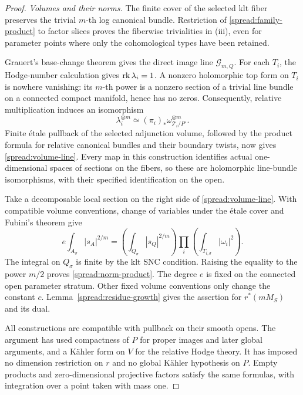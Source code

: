 \begin{proof}
\smallskip
\noindent\emph{Volumes and their norms.}
The finite cover of the selected klt fiber preserves the trivial
\(m\)-th log canonical bundle.  Restriction of
\eqref{spread:family-product} to factor slices proves the fiberwise
trivialities in (iii), even for parameter points where only the
cohomological types have been retained.

Grauert's base-change theorem gives the direct image line
\(\mathcal G_{m,Q}\).  For each \(T_i\), the Hodge-number calculation
gives \(\operatorname{rk}\lambda_i=1\).  A nonzero holomorphic top form on \(T_i\)
is nowhere vanishing: its \(m\)-th power is a nonzero section of a
trivial line bundle on a connected compact manifold, hence has
no zeros.  Consequently, relative multiplication induces an
isomorphism
\[
 \lambda_i^{\otimes m}
       \simeq(\pi_i)_*\omega_{\mathscr T_i/P^\circ}^{\otimes m}.
\]
Finite \'etale pullback of the selected adjunction volume, followed
by the product formula for relative canonical bundles and their
boundary twists, now gives \eqref{spread:volume-line}.  Every map
in this construction identifies actual one-dimensional spaces
of sections on the fibers, so these are holomorphic line-bundle
isomorphisms, with their specified identification on the open.

Take a decomposable local section on the right side of
\eqref{spread:volume-line}.  With compatible volume conventions,
change of variables under the \'etale cover and Fubini's theorem
give
\[
 e\int_{A_\sigma}|s_A|^{2/m}
   =
 \left(\int_{Q_\sigma}|s_Q|^{2/m}\right)
       \prod_i\left(\int_{T_{i,\sigma}}|\omega_i|^2\right).
\]
The integral on \(Q_\sigma\) is finite by the klt SNC condition.
Raising the equality to the power \(m/2\) proves
\eqref{spread:norm-product}.  The degree \(e\) is fixed on the
connected open parameter stratum.  Other fixed volume conventions
only change the constant \(c\).
Lemma~\ref{spread:residue-growth} gives the assertion for
\(r^*(mM_S)\) and its dual.

All constructions are compatible with pullback on their smooth
opens.  The argument has used compactness of \(P\) for proper
images and later global arguments, and a K\"ahler form on \(V\)
for the relative Hodge theory.  It has imposed no dimension
restriction on \(r\) and no global K\"ahler hypothesis on \(P\).
Empty products and zero-dimensional projective factors satisfy
the same formulas, with integration over a point taken with mass one.
\end{proof}
